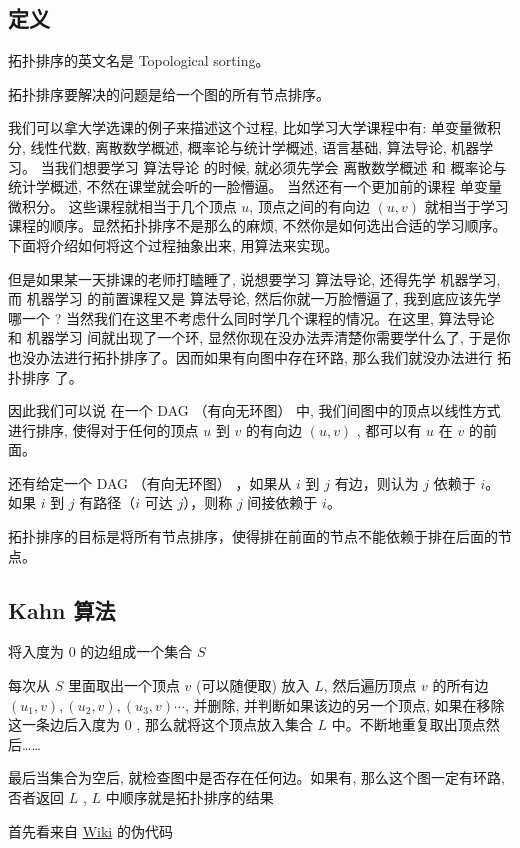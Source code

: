 
\subsection{定义}

拓扑排序的英文名是 Topological sorting。

拓扑排序要解决的问题是给一个图的所有节点排序。

我们可以拿大学选课的例子来描述这个过程, 比如学习大学课程中有: 单变量微积分, 线性代数, 离散数学概述, 概率论与统计学概述, 语言基础, 算法导论, 机器学习。 当我们想要学习 算法导论 的时候, 就必须先学会 离散数学概述 和 概率论与统计学概述, 不然在课堂就会听的一脸懵逼。 当然还有一个更加前的课程 单变量微积分。 这些课程就相当于几个顶点 $u$, 顶点之间的有向边 $(u,v)$ 就相当于学习课程的顺序。显然拓扑排序不是那么的麻烦, 不然你是如何选出合适的学习顺序。下面将介绍如何将这个过程抽象出来, 用算法来实现。

但是如果某一天排课的老师打瞌睡了, 说想要学习 算法导论, 还得先学 机器学习, 而 机器学习 的前置课程又是 算法导论, 然后你就一万脸懵逼了, 我到底应该先学哪一个 ? 当然我们在这里不考虑什么同时学几个课程的情况。在这里, 算法导论 和 机器学习 间就出现了一个环, 显然你现在没办法弄清楚你需要学什么了, 于是你也没办法进行拓扑排序了。因而如果有向图中存在环路, 那么我们就没办法进行 拓扑排序 了。

因此我们可以说 在一个  DAG （有向无环图）  中, 我们间图中的顶点以线性方式进行排序, 使得对于任何的顶点 $u$ 到 $v$ 的有向边  $(u,v)$  , 都可以有 $u$ 在 $v$ 的前面。

还有给定一个  DAG （有向无环图） ，如果从 $i$ 到 $j$ 有边，则认为 $j$ 依赖于 $i$。如果 $i$ 到 $j$ 有路径（$i$ 可达 $j$），则称 $j$ 间接依赖于 $i$。

拓扑排序的目标是将所有节点排序，使得排在前面的节点不能依赖于排在后面的节点。

\subsection{Kahn 算法}

将入度为 0 的边组成一个集合 $S$ 

每次从 $S$ 里面取出一个顶点 $v$ (可以随便取) 放入  $L$, 然后遍历顶点 $v$ 的所有边$(u_1, v), (u_2, v), (u_3, v) \cdots$, 并删除, 并判断如果该边的另一个顶点, 如果在移除这一条边后入度为 0 , 那么就将这个顶点放入集合 $L$ 中。不断地重复取出顶点然后……

最后当集合为空后, 就检查图中是否存在任何边。如果有, 那么这个图一定有环路, 否者返回 $L$ , $L$ 中顺序就是拓扑排序的结果

首先看来自 \href{https://en.wikipedia.org/wiki/Topological_sorting#Kahn's_algorithm}{Wiki} 的伪代码

